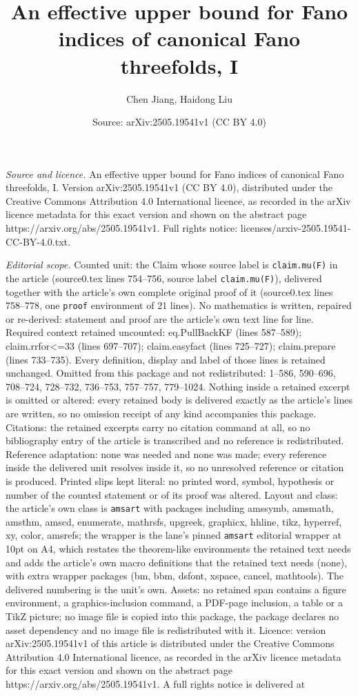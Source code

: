 \documentclass[10pt,a4paper]{amsart}
\title[An effective upper bound for Fano indices of canonical Fano ]{An effective upper bound for Fano indices of canonical Fano threefolds, I}
\author{Chen Jiang, Haidong Liu}
\date{Source: arXiv:2505.19541v1 (CC BY 4.0)}
\begin{document}
\maketitle

\noindent\emph{Source and licence.} An effective upper bound for Fano indices of canonical Fano threefolds, I. Version arXiv:2505.19541v1 (CC BY 4.0), distributed under the Creative Commons Attribution 4.0 International licence, as recorded in the arXiv licence metadata for this exact version and shown on the abstract page https://arxiv.org/abs/2505.19541v1. Full rights notice: licenses/arxiv-2505.19541-CC-BY-4.0.txt.\par\smallskip

\noindent\textit{Editorial scope.} Counted unit: the Claim whose source label is \texttt{claim.mu(F)} in the article (source0.tex lines 754--756, source label \texttt{claim.mu(F)}), delivered together with the article's own complete original proof of it (source0.tex lines 758--778, one \texttt{proof} environment of 21 lines). No mathematics is written, repaired or re-derived: statement and proof are the article's own text line for line. Required context retained uncounted: eq.PullBackKF (lines 587--589); claim.rrfor<=33 (lines 697--707); claim.easyfact (lines 725--727); claim.prepare (lines 733--735). Every definition, display and label of those lines is retained unchanged. Omitted from this package and not redistributed: 1--586, 590--696, 708--724, 728--732, 736--753, 757--757, 779--1024. Nothing inside a retained excerpt is omitted or altered: every retained body is delivered exactly as the article's lines are written, so no omission receipt of any kind accompanies this package. Citations: the retained excerpts carry no citation command at all, so no bibliography entry of the article is transcribed and no reference is redistributed. Reference adaptation: none was needed and none was made; every reference inside the delivered unit resolves inside it, so no unresolved reference or citation is produced. Printed slips kept literal: no printed word, symbol, hypothesis or number of the counted statement or of its proof was altered. Layout and class: the article's own class is \texttt{amsart} with packages including amssymb, amsmath, amsthm, amscd, enumerate, mathrsfs, upgreek, graphicx, hhline, tikz, hyperref, xy, color, amsrefs; the wrapper is the lane's pinned \texttt{amsart} editorial wrapper at 10pt on A4, which restates the theorem-like environments the retained text needs and adds the article's own macro definitions that the retained text needs (none), with extra wrapper packages (bm, bbm, dsfont, xspace, cancel, mathtools). The delivered numbering is the unit's own. Assets: no retained span contains a figure environment, a graphics-inclusion command, a PDF-page inclusion, a table or a TikZ picture; no image file is copied into this package, the package declares no asset dependency and no image file is redistributed with it. Licence: version arXiv:2505.19541v1 of this article is distributed under the Creative Commons Attribution 4.0 International licence, as recorded in the arXiv licence metadata for this exact version and shown on the abstract page https://arxiv.org/abs/2505.19541v1. A full rights notice is delivered at 
\end{document}
